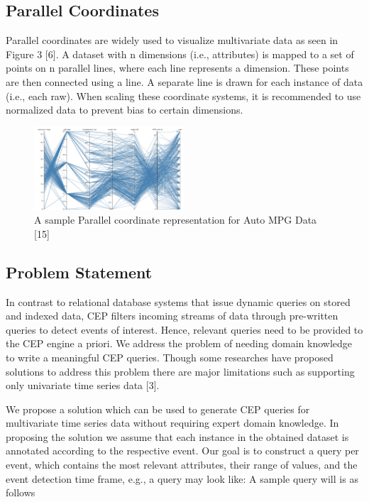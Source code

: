 \documentclass[conference]{IEEEtran}  %
\begin{document}
\subsection{Parallel Coordinates}

Parallel coordinates are widely used to visualize multivariate data as seen in Figure 3 [6]. A dataset with n dimensions (i.e., attributes) is mapped to a set of points on n parallel lines, where each line represents a dimension. These points are then connected using a line. A separate line is drawn for each instance of data (i.e., each raw). When scaling these coordinate systems, it is recommended to use normalized data to prevent bias to certain dimensions.
\begin{figure}[h!]
\includegraphics[width=0.5\textwidth]{parrelel.png}
\caption{A sample Parallel coordinate representation for Auto MPG Data [15]}
\end{figure}
 

\subsection{Problem Statement} 
In contrast to relational database systems that issue dynamic queries on stored and indexed data, CEP filters incoming streams of data through pre-written queries to detect events of interest. Hence, relevant queries need to be provided to the CEP engine a priori. We address the problem of needing domain knowledge to write a meaningful CEP queries. Though some researches have proposed solutions to address this problem there are major limitations such as supporting only univariate time series data [3]. 

We propose a solution which can be used to generate CEP queries for multivariate time series data without requiring expert domain knowledge. In proposing the solution we assume that each instance in the obtained dataset is annotated according to the respective event. Our goal is to construct a query per event, which contains the most relevant attributes, their range of values, and the event detection time frame, e.g., a query may look like:  A sample query will is as follows
\end{document}
